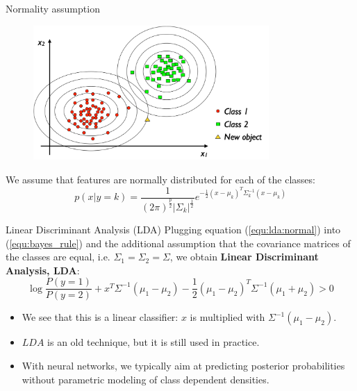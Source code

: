 \documentclass[xcolor=pdftex,dvipsnames,table]{beamer}
\begin{document}


\begin{frame}{Normality assumption}
\begin{figure}[htb]
\includegraphics[width=0.8\textwidth]{../graphics/LDA3.pdf}
\end{figure}
We assume that features are normally distributed for each of the classes:
\begin{equation}\label{equ:lda:normal}
p(x|y=k)=\frac{1}{(2\pi)^{\frac{p}{2}}|\Sigma_k|^{\frac{1}{2}}}e^{-\frac{1}{2}(x-\mu_k)^T\Sigma_k^{-1}(x-\mu_k)}
\end{equation}
\end{frame}

\begin{frame}{Linear Discriminant Analysis (LDA)}
Plugging equation (\ref{equ:lda:normal}) into (\ref{equ:bayes_rule}) and the additional assumption that the covariance matrices of the classes are equal, i.e. $\Sigma_1 = \Sigma_2 = \Sigma$, we obtain {\bf Linear Discriminant Analysis, LDA}:
\begin{equation*}
\log{\frac{P(y=1)}{P(y=2)}} + x^T\Sigma^{-1}(\mu_1-\mu_2) - \frac{1}{2}(\mu_1-\mu_2)^T\Sigma^{-1}(\mu_1+\mu_2) > 0
\end{equation*}
\begin{itemize}
	\item We see that this is a linear classifier: $x$ is multiplied with $\Sigma^{-1}(\mu_1-\mu_2)$.
	\item $LDA$ is an old technique, but it is still used in practice.
	\item With neural networks, we typically aim at predicting posterior probabilities without parametric modeling of class dependent densities.
\end{itemize}
\end{frame}
\end{document}
